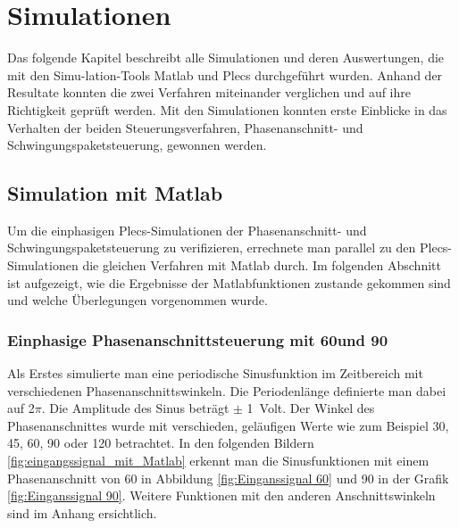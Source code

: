 \section{Simulationen}

Das folgende Kapitel beschreibt alle Simulationen und deren Auswertungen, die mit den Simu-lation-Tools Matlab und Plecs durchgeführt wurden. Anhand der Resultate konnten die zwei Verfahren miteinander verglichen und auf ihre Richtigkeit geprüft werden. Mit den Simulationen konnten erste Einblicke in das Verhalten der beiden Steuerungsverfahren, Phasenanschnitt- und Schwingungspaketsteuerung, gewonnen werden.

\subsection{Simulation mit Matlab}
Um die einphasigen Plecs-Simulationen der Phasenanschnitt- und Schwingungspaketsteuerung zu verifizieren, errechnete man parallel zu den Plecs-Simulationen die gleichen Verfahren mit Matlab durch. Im folgenden Abschnitt ist aufgezeigt, wie die Ergebnisse der Matlabfunktionen zustande gekommen sind und welche Überlegungen vorgenommen wurde.

\subsubsection{Einphasige Phasenanschnittsteuerung mit 60\textdegree und 90\textdegree}
Als Erstes simulierte man eine periodische Sinusfunktion im Zeitbereich mit verschiedenen Phasenanschnittswinkeln. Die Periodenlänge definierte man dabei auf 2$\pi$. Die Amplitude des Sinus beträgt $\pm$ \SI{1}{Volt}. Der Winkel des Phasenanschnittes wurde mit verschieden, geläufigen Werte wie zum Beispiel 30\textdegree, 45\textdegree \hspace{0.02cm}, 60\textdegree \hspace{0.02cm}, 90\textdegree \hspace{0.02cm} oder 120\textdegree \hspace{0.02cm} betrachtet. In den folgenden Bildern \ref{fig:eingangssignal_mit_Matlab} erkennt man die Sinusfunktionen mit einem Phasenanschnitt von 60\textdegree \hspace{0.02cm} in Abbildung \ref{fig:Einganssignal 60} und 90\textdegree \hspace{0.02cm} in der Grafik \ref{fig:Einganssignal 90}. Weitere Funktionen mit den anderen Anschnittswinkeln sind im Anhang ersichtlich.
 

